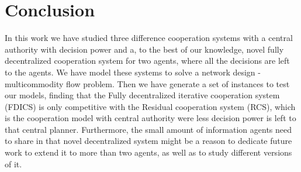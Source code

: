 \documentclass{article}
\begin{document}
\section{Conclusion} \label{seq:conclusion}

In this work we have studied three difference cooperation systems with a central authority with decision power and a, to the best of our knowledge, novel fully decentralized cooperation system for two agents, where all the decisions are left to the agents. We have model these systems to solve a network design - multicommodity flow problem. Then we have generate a set of instances to test our models, finding that the Fully decentralized iterative cooperation system (FDICS) is only competitive with the Residual cooperation system (RCS), which is the cooperation model with central authority were less decision power is left to that central planner. Furthermore, the small amount of information agents need to share in that novel decentralized system might be a reason to dedicate future work to extend it to more than two agents, as well as to study different versions of it. 

\printbibliography
\end{document}
